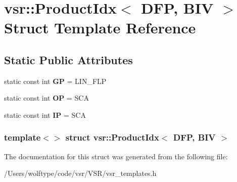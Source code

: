 \hypertarget{structvsr_1_1_product_idx_3_01_d_f_p_00_01_b_i_v_01_4}{\section{vsr\-:\-:Product\-Idx$<$ D\-F\-P, B\-I\-V $>$ Struct Template Reference}
\label{structvsr_1_1_product_idx_3_01_d_f_p_00_01_b_i_v_01_4}
}
\subsection*{Static Public Attributes}
\begin{DoxyCompactItemize}
\item 
\hypertarget{structvsr_1_1_product_idx_3_01_d_f_p_00_01_b_i_v_01_4_ae25267cb3d0770dab9e2d685dee0f801}{static const int {\bfseries G\-P} = L\-I\-N\-\_\-\-F\-L\-P}\label{structvsr_1_1_product_idx_3_01_d_f_p_00_01_b_i_v_01_4_ae25267cb3d0770dab9e2d685dee0f801}

\item 
\hypertarget{structvsr_1_1_product_idx_3_01_d_f_p_00_01_b_i_v_01_4_ae07edaa1bc2826bca641c92c36672db2}{static const int {\bfseries O\-P} = S\-C\-A}\label{structvsr_1_1_product_idx_3_01_d_f_p_00_01_b_i_v_01_4_ae07edaa1bc2826bca641c92c36672db2}

\item 
\hypertarget{structvsr_1_1_product_idx_3_01_d_f_p_00_01_b_i_v_01_4_a8da97b05e8cf9cb3f8f8549691a51b58}{static const int {\bfseries I\-P} = S\-C\-A}\label{structvsr_1_1_product_idx_3_01_d_f_p_00_01_b_i_v_01_4_a8da97b05e8cf9cb3f8f8549691a51b58}

\end{DoxyCompactItemize}
\subsubsection*{template$<$$>$ struct vsr\-::\-Product\-Idx$<$ D\-F\-P, B\-I\-V $>$}



The documentation for this struct was generated from the following file\-:\begin{DoxyCompactItemize}
\item 
/\-Users/wolftype/code/vsr/\-V\-S\-R/vsr\-\_\-templates.\-h\end{DoxyCompactItemize}

